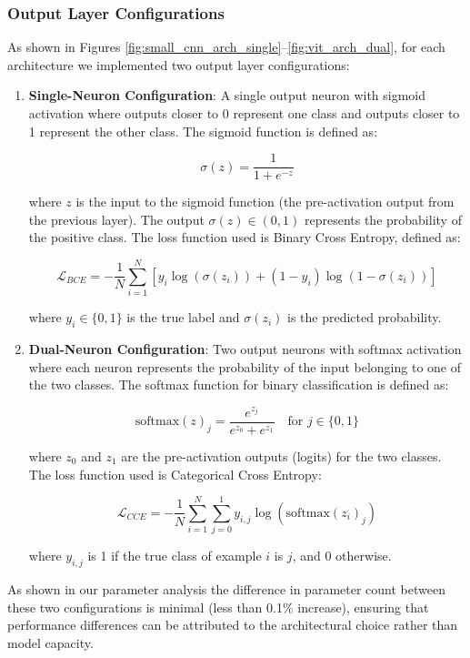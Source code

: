 \FloatBarrier
\subsubsection{Output Layer Configurations}

As shown in Figures \ref{fig:small_cnn_arch_single}--\ref{fig:vit_arch_dual}, for each architecture we implemented two output layer configurations:

\begin{enumerate}
\item \textbf{Single-Neuron Configuration}: A single output neuron with sigmoid activation where outputs closer to 0 represent one class and outputs closer to 1 represent the other class. The sigmoid function is defined as:

\begin{equation}
\sigma(z) = \frac{1}{1 + e^{-z}}
\end{equation}

where $z$ is the input to the sigmoid function (the pre-activation output from the previous layer). The output $\sigma(z) \in (0,1)$ represents the probability of the positive class. The loss function used is Binary Cross Entropy, defined as:

\begin{equation}
\mathcal{L}_{BCE} = -\frac{1}{N}\sum_{i=1}^{N}[y_i \log(\sigma(z_i)) + (1-y_i)\log(1-\sigma(z_i))]
\end{equation}

where $y_i \in \{0,1\}$ is the true label and $\sigma(z_i)$ is the predicted probability.

\item \textbf{Dual-Neuron Configuration}: Two output neurons with softmax activation where each neuron represents the probability of the input belonging to one of the two classes. The softmax function for binary classification is defined as:

\begin{equation}
\text{softmax}(z)_j = \frac{e^{z_j}}{e^{z_0} + e^{z_1}} \quad \text{for } j \in \{0,1\}
\end{equation}

where $z_0$ and $z_1$ are the pre-activation outputs (logits) for the two classes. The loss function used is Categorical Cross Entropy:

\begin{equation}
\mathcal{L}_{CCE} = -\frac{1}{N}\sum_{i=1}^{N}\sum_{j=0}^{1}y_{i,j}\log(\text{softmax}(z_i)_j)
\end{equation}

where $y_{i,j}$ is 1 if the true class of example $i$ is $j$, and 0 otherwise.
\end{enumerate}

As shown in our parameter analysis the difference in parameter count between these two configurations is minimal (less than 0.1\% increase), ensuring that performance differences can be attributed to the architectural choice rather than model capacity.
